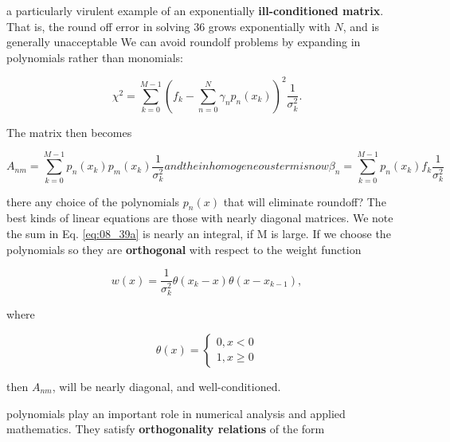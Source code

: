 a particularly virulent example of an exponentially \textbf{ill-conditioned matrix}. That is, the round off error in solving 36 grows exponentially with $N$, and is generally unacceptable We can avoid roundolf problems by expanding in polynomials rather than monomials:

\begin{equation}\label{eq:08_38}
\chi^{2} = \sum_{k=0}^{M-1} (f_{k} - \sum_{n=0}^{N} \gamma_{n}p_{n}(x_{k}) )^2 \frac{1}{\sigma_{k}^{2}} .
\end{equation}

The matrix then becomes

\begin{subequations}
    \begin{equation}
    A_{nm} = \sum_{k=0}^{M-1} p_{n}(x_{k})p_{m}(x_{k}) \frac{1}{\sigma_{k}^{2}}
    \end{equation}
and the inhomogeneous term is now
    \begin{equation}
    \beta_{n} = \sum_{k=0}^{M-1} p_{n}(x_{k})f_{k} \frac{1}{\sigma_{k}^{2}}
    \end{equation}
    \label{eq:08_39a}
\end{subequations}

 there any choice of the polynomials $p_{n}(x)$ that will eliminate roundoff? The best kinds of linear equations are those with nearly diagonal matrices. We note the sum in Eq. \ref{eq:08_39a} is nearly an integral, if M is large. If we choose the polynomials so they are \textbf{orthogonal} with respect to the weight function

\begin{equation*}
w(x) = \frac{1}{\sigma_{k}^{2}} \theta(x_{k} - x ) \theta(x - x_{k-1}),
\end{equation*}

where

\begin{equation*}
\theta(x) =
    \begin{cases}
        0, x < 0 \\
        1, x \geq 0
    \end{cases}
\end{equation*}

then $A_{nm}$, will be nearly diagonal, and well-conditioned.

 polynomials play an important role in numerical analysis and applied mathematics. They satisfy \textbf{orthogonality relations} of the form


